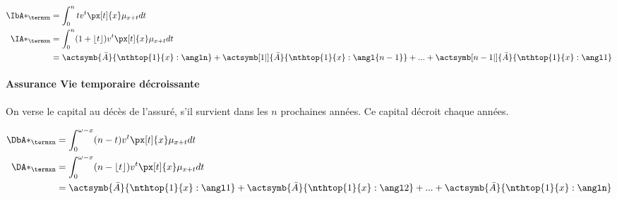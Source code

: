 \documentclass[10pt, french]{article}
\begin{document}
\begin{multicols*}{3}
\begin{align*}
	\IbA*_{\termxn} &= \int_0^n t v^t \px[t]{x} \mu_{x+t} dt \\
	\IA*_{\termxn}  &= \int_0^n (1 + \lfloor t \rfloor) v^t \px[t]{x} \mu_{x+t} dt \\
		&= \actsymb{\bar{A}}{\nthtop{1}{x}:\angln} + \actsymb[1|]{\bar{A}}{\nthtop{1}{x}:\angl{n-1}} + ... + \actsymb[n-1|]{\bar{A}}{\nthtop{1}{x}:\angl1}
\end{align*}

\paragraph{Assurance Vie temporaire décroissante} On verse le capital au décès de l'assuré, s'il survient dans les $n$ prochaines années. Ce capital décroit chaque années.

\begin{align*}
	\DbA*_{\termxn} &= \int_0^{\omega - x} (n - t) v^t \px[t]{x} \mu_{x+t} dt \\
	\DA*_{\termxn}  &= \int_0^{\omega - x} (n - \lfloor t \rfloor) v^t \px[t]{x} \mu_{x+t} dt \\
		&= \actsymb{\bar{A}}{\nthtop{1}{x}:\angl1} + \actsymb{\bar{A}}{\nthtop{1}{x}:\angl2} + ... + \actsymb{\bar{A}}{\nthtop{1}{x}:\angln}
\end{align*}



\end{multicols*}
\end{document}
